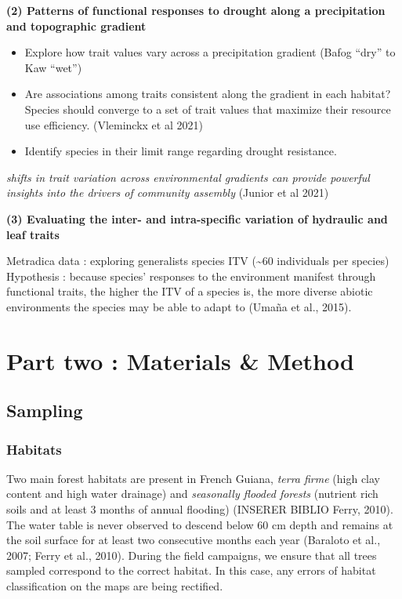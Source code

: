 \documentclass[
]{book}
\providecommand{\tightlist}{%
  \setlength{\itemsep}{0pt}\setlength{\parskip}{0pt}}
\begin{document}
\textbf{(2) Patterns of functional responses to drought along a precipitation and topographic gradient}

\begin{itemize}
\tightlist
\item
  Explore how trait values vary across a precipitation gradient (Bafog ``dry'' to Kaw ``wet'')
\item
  Are associations among traits consistent along the gradient in each habitat? Species should converge to a set of trait values that maximize their resource use efficiency. (Vleminckx et al 2021)
\item
  Identify species in their limit range regarding drought resistance.
\end{itemize}

\emph{shifts in trait variation across environmental gradients can provide powerful insights into the drivers of community assembly} (Junior et al 2021)

\textbf{(3) Evaluating the inter- and intra-specific variation of hydraulic and leaf traits}

Metradica data : exploring generalists species ITV (\textasciitilde60 individuals per species)
Hypothesis : because species' responses to the environment manifest through functional traits, the higher the ITV of a species is, the more diverse abiotic environments the species may be able to adapt to (Umaña et al., 2015).

\hypertarget{part-part-two-materials-method}{%
\part{Part two : Materials \& Method}\label{part-part-two-materials-method}}

\hypertarget{sampling}{%
\chapter{Sampling}\label{sampling}}

\hypertarget{habitats}{%
\section{Habitats}\label{habitats}}

Two main forest habitats are present in French Guiana, \emph{terra firme} (high clay content and high water drainage) and \emph{seasonally flooded forests} (nutrient rich soils and at least 3 months of annual flooding) (INSERER BIBLIO Ferry, 2010). The water table is never observed to descend below 60 cm depth and remains at the soil surface for at least two consecutive months each year (Baraloto et al., 2007; Ferry et al., 2010).
During the field campaigns, we ensure that all trees sampled correspond to the correct habitat. In this case, any errors of habitat classification on the maps are being rectified.
\end{document}
